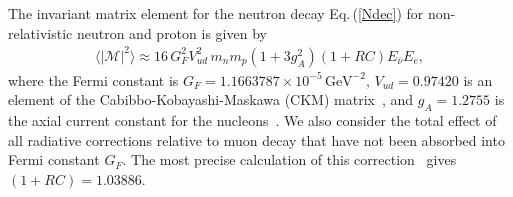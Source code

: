 The invariant matrix element for the neutron decay Eq.\,(\ref{Ndec}) for non-relativistic neutron and proton is given by
\begin{align}
\langle|\mathcal{M}|^2\rangle\approx16\,G^2_FV^2_{ud}\,m_nm_p(1+3g^2_A)(1+RC)E_{\bar{\nu}}E_e,
\end{align}
where the Fermi constant is $G_F=1.1663787\times10^{-5}\,\mathrm{GeV}^{-2}$, $V_{ud}=0.97420$ is an element of the Cabibbo-Kobayashi-Maskawa (CKM) matrix~\cite{Czarnecki:2018okw,Marciano:2005ec,Czarnecki:2004cw}, and $g_A=1.2755$ is the axial current constant for the nucleons~\cite{Czarnecki:2018okw,Marciano:2014ria}. We also consider the total effect of all radiative corrections relative to muon decay that have not been absorbed into Fermi constant $G_F$. The most precise calculation of this correction~\cite{Marciano:2014ria,Marciano:2005ec} gives $(1+RC)=1.03886$. 

